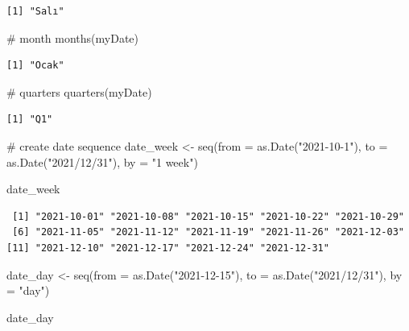 \documentclass[
  letterpaper,
  DIV=11,
  numbers=noendperiod]{scrreprt}
\newenvironment{Shaded}{\begin{snugshade}}{\end{snugshade}}
\newcommand{\AttributeTok}[1]{\textcolor[rgb]{0.40,0.45,0.13}{#1}}
\newcommand{\CommentTok}[1]{\textcolor[rgb]{0.37,0.37,0.37}{#1}}
\newcommand{\FunctionTok}[1]{\textcolor[rgb]{0.28,0.35,0.67}{#1}}
\newcommand{\NormalTok}[1]{\textcolor[rgb]{0.00,0.23,0.31}{#1}}
\newcommand{\OtherTok}[1]{\textcolor[rgb]{0.00,0.23,0.31}{#1}}
\newcommand{\StringTok}[1]{\textcolor[rgb]{0.13,0.47,0.30}{#1}}
\begin{document}
\begin{verbatim}
[1] "Salı"
\end{verbatim}

\begin{Shaded}
\begin{Highlighting}[]
\CommentTok{\# month}
\FunctionTok{months}\NormalTok{(myDate)}
\end{Highlighting}
\end{Shaded}

\begin{verbatim}
[1] "Ocak"
\end{verbatim}

\begin{Shaded}
\begin{Highlighting}[]
\CommentTok{\# quarters}
\FunctionTok{quarters}\NormalTok{(myDate)}
\end{Highlighting}
\end{Shaded}

\begin{verbatim}
[1] "Q1"
\end{verbatim}

\begin{Shaded}
\begin{Highlighting}[]
\CommentTok{\# create date sequence }
\NormalTok{date\_week }\OtherTok{\textless{}{-}} \FunctionTok{seq}\NormalTok{(}\AttributeTok{from =} \FunctionTok{as.Date}\NormalTok{(}\StringTok{"2021{-}10{-}1"}\NormalTok{), }
    \AttributeTok{to =} \FunctionTok{as.Date}\NormalTok{(}\StringTok{"2021/12/31"}\NormalTok{), }
    \AttributeTok{by =} \StringTok{"1 week"}\NormalTok{)}

\NormalTok{date\_week}
\end{Highlighting}
\end{Shaded}

\begin{verbatim}
 [1] "2021-10-01" "2021-10-08" "2021-10-15" "2021-10-22" "2021-10-29"
 [6] "2021-11-05" "2021-11-12" "2021-11-19" "2021-11-26" "2021-12-03"
[11] "2021-12-10" "2021-12-17" "2021-12-24" "2021-12-31"
\end{verbatim}

\begin{Shaded}
\begin{Highlighting}[]
\NormalTok{date\_day }\OtherTok{\textless{}{-}} \FunctionTok{seq}\NormalTok{(}\AttributeTok{from =} \FunctionTok{as.Date}\NormalTok{(}\StringTok{"2021{-}12{-}15"}\NormalTok{), }
    \AttributeTok{to =} \FunctionTok{as.Date}\NormalTok{(}\StringTok{"2021/12/31"}\NormalTok{), }
    \AttributeTok{by =} \StringTok{"day"}\NormalTok{)}

\NormalTok{date\_day}
\end{Highlighting}
\end{Shaded}
\end{document}
